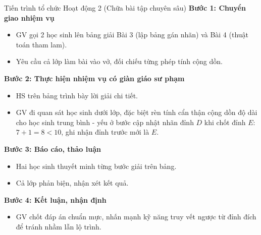 \documentclass[12pt, a4paper]{article}
\begin{document}
\begin{pedabox}{Tiến trình tổ chức Hoạt động 2 (Chữa bài tập chuyên sâu)}
    \textbf{Bước 1: Chuyển giao nhiệm vụ}
    \begin{itemize}[leftmargin=0.6cm]
        \item GV gọi 2 học sinh lên bảng giải Bài 3 (lập bảng gán nhãn) và Bài 4 (thuật toán tham lam).
        \item Yêu cầu cả lớp làm bài vào vở, đối chiếu từng phép tính cộng dồn.
    \end{itemize}

    \textbf{Bước 2: Thực hiện nhiệm vụ có giàn giáo sư phạm}
    \begin{itemize}[leftmargin=0.6cm]
        \item HS trên bảng trình bày lời giải chi tiết.
        \item GV đi quan sát học sinh dưới lớp, đặc biệt rèn tính cẩn thận cộng dồn độ dài cho học sinh trung bình - yếu ở bước cập nhật nhãn đỉnh $D$ khi chốt đỉnh $E$: $7 + 1 = 8 < 10$, ghi nhận đỉnh trước mới là $E$.
    \end{itemize}

    \textbf{Bước 3: Báo cáo, thảo luận}
    \begin{itemize}[leftmargin=0.6cm]
        \item Hai học sinh thuyết minh từng bước giải trên bảng.
        \item Cả lớp phản biện, nhận xét kết quả.
    \end{itemize}

    \textbf{Bước 4: Kết luận, nhận định}
    \begin{itemize}[leftmargin=0.6cm]
        \item GV chốt đáp án chuẩn mực, nhấn mạnh kỹ năng truy vết ngược từ đỉnh đích để tránh nhầm lẫn lộ trình.
    \end{itemize}
\end{pedabox}
\end{document}
